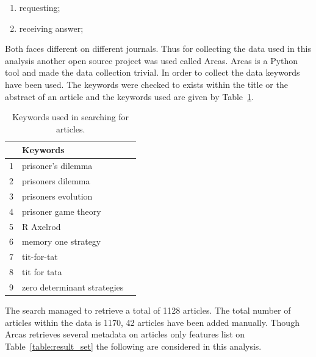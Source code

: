 \documentclass{article}
\begin{document}
\begin{enumerate}
    \item requesting;
    \item receiving answer;
\end{enumerate}

Both faces different on different journals. Thus for collecting the data 
used in this analysis another open source project was used called Arcas. Arcas is
a Python tool and made the data collection trivial. In order to collect the data
keywords have been used. The keywords were checked to exists within the title or
the abstract of an article and the keywords used are given by Table~\ref{table:search_keywords}. 

\begin{table}[!hbtp]
    \begin{center}
        \begin{tabular}{lll}
            \toprule
             & Keywords & \\
            \midrule
             1 &  prisoner's dilemma & \\
             2 &  prisoners dilemma  & \\  
             3 &  prisoners evolution & \\
             4 &  prisoner game theory & \\
             5 &  R Axelrod & \\
             6 &  memory one strategy & \\
             7 & tit-for-tat & \\
             8 & tit for tata & \\
             9 & zero determinant strategies & \\
            \bottomrule
        \end{tabular}
    \end{center}
    \caption{Keywords used in searching for articles.}
    \label{table:search_keywords}
\end{table}

The search managed to retrieve a total of 1128 articles. The total number
of articles within the data is 1170, 42 articles have been added manually.
Though Arcas retrieves several metadata on articles only features list on 
Table~\ref{table:result_set} the following are considered in this analysis.
\end{document}
